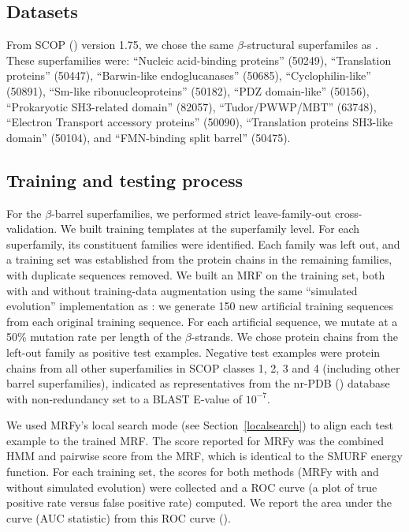 \documentclass{acm_proc_article-sp}
\begin{document}
\subsection{Datasets} \label{mrfy-datasets}

From SCOP (\cite{Murzin:1995uh}) version 1.75, we chose the same
$\beta$-structural superfamiles as \citet{Daniels:2012dg}.
These superfamilies were: ``Nucleic acid-binding proteins'' (50249), 
``Translation proteins'' (50447), 
``Barwin-like endoglucanases'' (50685), ``Cyclophilin-like'' (50891), ``Sm-like 
ribonucleoproteins'' (50182), ``PDZ domain-like'' (50156), ``Prokaryotic 
SH3-related domain'' (82057), ``Tudor/PWWP/MBT'' (63748), ``Electron Transport 
accessory proteins'' (50090), ``Translation proteins SH3-like domain'' (50104), 
and ``FMN-binding split barrel'' (50475). 

\subsection{Training and testing process} \label{mrfy-training}

For the $\beta$-barrel superfamilies, we performed strict leave-family-out 
cross-validation. 
We built training templates at the superfamily level. 
For each superfamily, its constituent families were identified. 
Each family was left out, and a training set was established from the protein 
chains in the remaining families, with duplicate sequences removed. 
We built an MRF on the training set, both with and without training-data
augmentation using the same ``simulated evolution'' implementation as 
\citet{Daniels:2012dg}: we generate 150 new artificial training 
sequences from each original training sequence. 
For each artificial sequence, we mutate at a 50\% mutation rate per length of 
the $\beta$-strands.
We chose protein chains from the left-out family as positive test examples. 
Negative test examples were protein chains from all other superfamilies in SCOP 
classes 1, 2, 3 and 4 (including other barrel superfamilies), indicated as 
representatives from the nr-PDB (\cite{Berman:2000hl}) database with 
non-redundancy set to a BLAST E-value of $10^{-7}$.

We used MRFy's local search mode (see Section~\ref{localsearch}) to align each
test example to the trained MRF.
The score reported for MRFy was the combined HMM and pairwise score from the 
MRF, which is identical to the SMURF energy function.
For each training set, the scores for both methods (MRFy with and without
simulated evolution) were collected and a ROC curve (a plot of true positive 
rate versus false positive rate) computed. We report the area under the curve 
(AUC statistic) from this ROC curve (\cite{Sonego:2008uy}).
\end{document}
